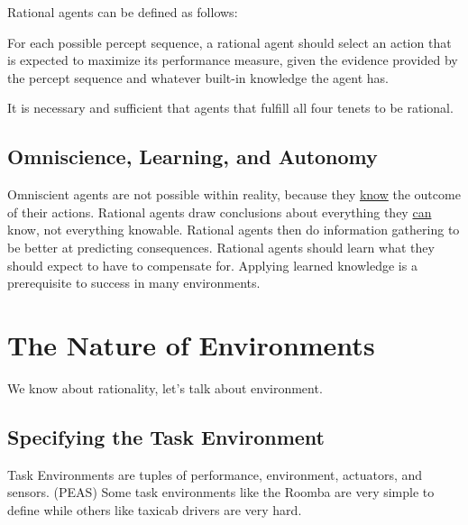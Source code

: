 Rational agents can be defined as follows:

\begin{em}
    For each possible percept sequence, a rational agent should select an action
    that is expected to maximize its performance measure, given the evidence
    provided by the percept sequence and whatever built-in knowledge the agent
    has.
\end{em}

It is necessary and sufficient that agents that fulfill all four tenets to be
rational.


\subsection{Omniscience, Learning, and Autonomy} %
\label{sub:omniscience_learning_and_autonomy}

Omniscient agents are not possible within reality, because they \uline{know} the
outcome of their actions.
Rational agents draw conclusions about everything they \uline{can} know, not
everything knowable.
Rational agents then do information gathering to be better at predicting
consequences.
Rational agents should learn what they should expect to have to compensate for.
Applying learned knowledge is a prerequisite to success in many environments.



\section{The Nature of Environments} %
\label{sec:the_nature_of_environments}

We know about rationality, let's talk about environment.

\subsection{Specifying the Task Environment} %
\label{sub:specifying_the_task_environment}

Task Environments are tuples of performance, environment, actuators, and
sensors. (PEAS)
Some task environments like the Roomba are very simple to define while others
like taxicab drivers are very hard.


